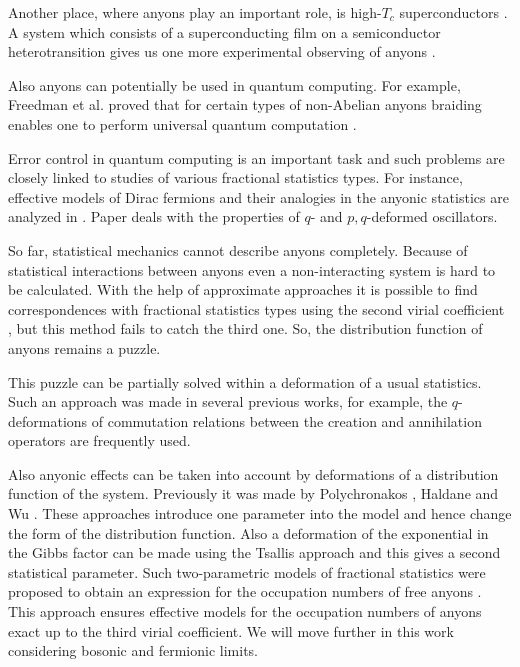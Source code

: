 \documentclass[12pt,a4paper]{article}
\begin{document}
Another place, where anyons play an important role, is high-$T_c$ superconductors \cite{Yang&Ge:1994}. A system which consists of a superconducting film on a semiconductor heterotransition gives us one more experimental observing of anyons \cite{Weeks_etal:2007}. 

Also anyons can potentially be used in quantum computing. For example, Freedman et al. \cite{Freedman_etal:2002} proved that for certain types of non-Abelian anyons \cite{Polychronakos:2000,You_etal:2013,Mancarella_etal:2013} braiding enables one to perform universal quantum computation \cite{Burton_etal:2017,Li_etal:2017}.

Error control in quantum computing is an important task \cite{Knapp_etal:2016} and such problems are closely linked to studies of various fractional statistics types. For instance, effective models of Dirac fermions and their analogies in the anyonic statistics are analyzed in \cite{Lapa_etal:2016}. Paper \cite{Gavrilik&Kachurik:2016} deals with the properties of $q$- and $p,q$-deformed oscillators.

So far, statistical mechanics cannot describe anyons completely. Because of statistical interactions between anyons even a non-interacting system is hard to be calculated. With the help of approximate approaches it is possible to find correspondences with fractional statistics types using the second virial coefficient \cite{Khare:2005}, but this method fails to catch the third one. So, the distribution function of anyons remains a puzzle.

This puzzle can be partially solved within a deformation of a usual statistics. Such an approach was made in several previous works, for example, the $q$-deformations of commutation relations between the creation and annihilation operators \cite{Dalton&Inomata:1995,Algin_etal:2002,Algin:2010,Gavrilik&Mishchenko:2013} are frequently used.

Also anyonic effects can be taken into account by deformations of a distribution function of the system. Previously it was made by Polychronakos \cite{Polychronakos:1996}, Haldane \cite{Haldane:1991} and Wu \cite{Wu:1994}. These approaches introduce one parameter into the model and hence change the form of the distribution function. Also a deformation of the exponential in the Gibbs factor can be made using the Tsallis approach \cite{Tsallis:1988} and this gives a second statistical parameter. Such two-parametric models of fractional statistics were proposed to obtain an expression for the occupation numbers of free anyons %
\cite{Rovenchak:2014EPJB,Hornetska&Rovenchak:2016en}. This approach ensures effective models for the occupation numbers of anyons exact up to the third virial coefficient. We will move further in this work considering bosonic and fermionic limits.
\end{document}
